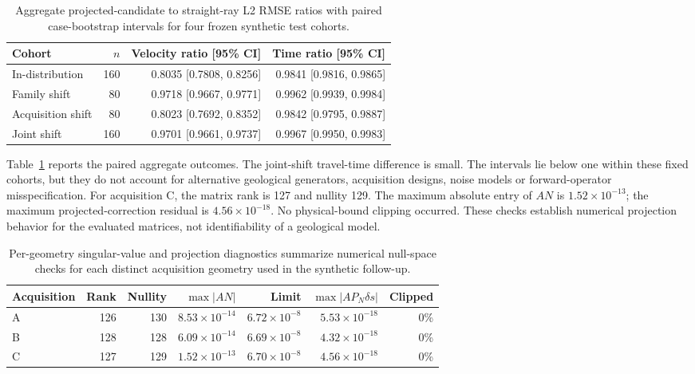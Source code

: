\documentclass[11pt]{article}
\begin{document}
\begin{table}[htbp]
\centering
\small
\caption{Aggregate projected-candidate to straight-ray L2 RMSE ratios with paired case-bootstrap intervals for four frozen synthetic test cohorts.}
\label{tab:nullspace-ratios}
\begin{tabular}{lrrr}
\toprule
Cohort & $n$ & Velocity ratio [95\% CI] & Time ratio [95\% CI] \\
\midrule
In-distribution & 160 & 0.8035 [0.7808, 0.8256] & 0.9841 [0.9816, 0.9865] \\
Family shift & 80 & 0.9718 [0.9667, 0.9771] & 0.9962 [0.9939, 0.9984] \\
Acquisition shift & 80 & 0.8023 [0.7692, 0.8352] & 0.9842 [0.9795, 0.9887] \\
Joint shift & 160 & 0.9701 [0.9661, 0.9737] & 0.9967 [0.9950, 0.9983] \\
\bottomrule
\end{tabular}
\end{table}

Table~\ref{tab:nullspace-ratios} reports the paired aggregate outcomes. The joint-shift travel-time difference is small. The intervals lie below one within these fixed cohorts, but they do not account for alternative geological generators, acquisition designs, noise models or forward-operator misspecification. For acquisition C, the matrix rank is 127 and nullity 129. The maximum absolute entry of $AN$ is $1.52\times10^{-13}$; the maximum projected-correction residual is $4.56\times10^{-18}$. No physical-bound clipping occurred. These checks establish numerical projection behavior for the evaluated matrices, not identifiability of a geological model.

\begin{table}[htbp]
\centering
\caption{Per-geometry singular-value and projection diagnostics summarize numerical null-space checks for each distinct acquisition geometry used in the synthetic follow-up.}
\label{tab:projection-diagnostics}
\begin{tabular}{lrrrrrr}
\toprule
Acquisition & Rank & Nullity & $\max|AN|$ & Limit & $\max|A P_N\delta s|$ & Clipped \\
\midrule
A & 126 & 130 & $8.53\times10^{-14}$ & $6.72\times10^{-8}$ & $5.53\times10^{-18}$ & 0\% \\
B & 128 & 128 & $6.09\times10^{-14}$ & $6.69\times10^{-8}$ & $4.32\times10^{-18}$ & 0\% \\
C & 127 & 129 & $1.52\times10^{-13}$ & $6.70\times10^{-8}$ & $4.56\times10^{-18}$ & 0\% \\
\bottomrule
\end{tabular}
\end{table}
\end{document}
